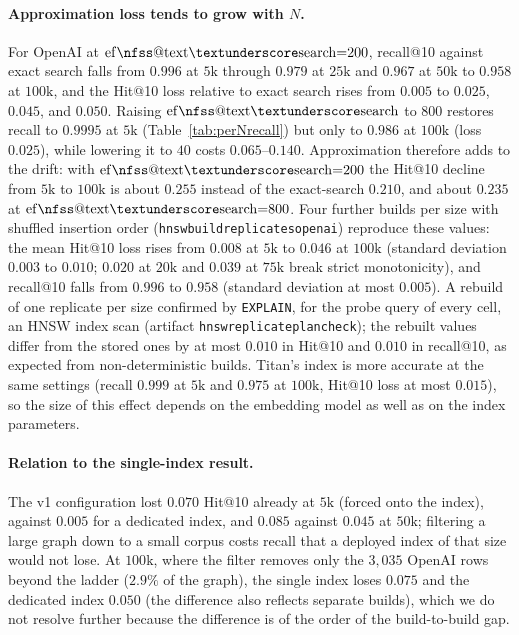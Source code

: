 \documentclass{ieeeaccess}
\makeatletter
\DeclareRobustCommand{\_}{\ifmmode\nfss@text{\textunderscore}\else\textunderscore\allowbreak\fi}
\makeatother
\begin{document}
\paragraph{Approximation loss tends to grow with $N$.}
For OpenAI at $\mathrm{ef\_search}{=}200$, recall@10 against exact search falls from $0.996$ at $5\text{k}$ through $0.979$ at $25\text{k}$ and $0.967$ at $50\text{k}$ to $0.958$ at $100\text{k}$, and the Hit@10 loss relative to exact search rises from $0.005$ to $0.025$, $0.045$, and $0.050$. Raising $\mathrm{ef\_search}$ to $800$ restores recall to $0.9995$ at $5\text{k}$ (Table~\ref{tab:perNrecall}) but only to $0.986$ at $100\text{k}$ (loss $0.025$), while lowering it to $40$ costs $0.065$--$0.140$. Approximation therefore adds to the drift: with $\mathrm{ef\_search}{=}200$ the Hit@10 decline from $5\text{k}$ to $100\text{k}$ is about $0.255$ instead of the exact-search $0.210$, and about $0.235$ at $\mathrm{ef\_search}{=}800$. Four further builds per size with shuffled insertion order (\texttt{hnsw\_build\_replicates\_openai}) reproduce these values: the mean Hit@10 loss rises from $0.008$ at $5\text{k}$ to $0.046$ at $100\text{k}$ (standard deviation $0.003$ to $0.010$; $0.020$ at $20\text{k}$ and $0.039$ at $75\text{k}$ break strict monotonicity), and recall@10 falls from $0.996$ to $0.958$ (standard deviation at most $0.005$). A rebuild of one replicate per size confirmed by \texttt{EXPLAIN}, for the probe query of every cell, an HNSW index scan (artifact \texttt{hnsw\_replicate\_plan\_check}); the rebuilt values differ from the stored ones by at most $0.010$ in Hit@10 and $0.010$ in recall@10, as expected from non-deterministic builds. Titan's index is more accurate at the same settings (recall $0.999$ at $5\text{k}$ and $0.975$ at $100\text{k}$, Hit@10 loss at most $0.015$), so the size of this effect depends on the embedding model as well as on the index parameters.

\paragraph{Relation to the single-index result.}
The v1 configuration lost $0.070$ Hit@10 already at $5\text{k}$ (forced onto the index), against $0.005$ for a dedicated index, and $0.085$ against $0.045$ at $50\text{k}$; filtering a large graph down to a small corpus costs recall that a deployed index of that size would not lose. At $100\text{k}$, where the filter removes only the $3{,}035$ OpenAI rows beyond the ladder ($2.9\%$ of the graph), the single index loses $0.075$ and the dedicated index $0.050$ (the difference also reflects separate builds), which we do not resolve further because the difference is of the order of the build-to-build gap.
\end{document}
